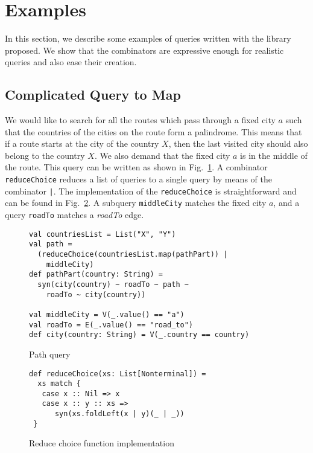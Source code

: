 \section{Examples}
\label{sec:examples}

In this section, we describe some examples of queries written with the library proposed.
We show that the combinators are expressive enough for realistic queries and also ease their creation.

\subsection{Complicated Query to Map}

We would like to search for all the routes which pass through a fixed city $a$ such that the countries of the cities on the route form a palindrome.
This means that if a route starts at the city of the country $X$, then the last visited city should also belong to the country $X$.
We also demand that the fixed city $a$ is in the middle of the route.
This query can be written as shown in Fig.~\ref{fig:pathQuery}.
A combinator \lstinline{reduceChoice} reduces a list of queries to a single query by means of the combinator \lstinline{|}.
The implementation of the \lstinline{reduceChoice} is straightforward and can be found in Fig.~\ref{fig:reduceChoice}.
A subquery \lstinline{middleCity} matches the fixed city $a$, and a query \lstinline{roadTo} matches a \emph{roadTo} edge.

\begin{figure}[h]
\begin{lstlisting}
val countriesList = List("X", "Y")
val path =
  (reduceChoice(countriesList.map(pathPart)) |
    middleCity)
def pathPart(country: String) =
  syn(city(country) ~ roadTo ~ path ~
    roadTo ~ city(country))

val middleCity = V(_.value() == "a")
val roadTo = E(_.value() == "road_to")
def city(country: String) = V(_.country == country)
\end{lstlisting}
\caption{Path query}
\label{fig:pathQuery}
\end{figure}

\begin{figure}[h]
\begin{lstlisting}
def reduceChoice(xs: List[Nonterminal]) =
  xs match {
   case x :: Nil => x
   case x :: y :: xs =>
      syn(xs.foldLeft(x | y)(_ | _))
 }
\end{lstlisting}
\caption{Reduce choice function implementation}
\label{fig:reduceChoice}
\end{figure}


